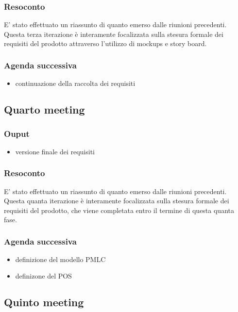 \subsubsection*{Resoconto}
E' stato effettuato un riassunto di quanto emerso dalle riunioni precedenti.
Questa terza iterazione è interamente focalizzata sulla stesura formale dei requisiti del prodotto attraverso 
l'utilizzo di mockups e story board.
\subsubsection*{Agenda successiva}
\begin{itemize}
    \item continuazione della raccolta dei requisiti
\end{itemize} 



\subsection*{Quarto meeting}
\subsubsection*{Ouput}
\begin{itemize}
    \item versione finale dei requisiti
\end{itemize} 
\subsubsection*{Resoconto}
E' stato effettuato un riassunto di quanto emerso dalle riunioni precedenti.
Questa quanta iterazione è interamente focalizzata sulla stesura formale dei requisiti del prodotto, 
che viene completata entro il termine di questa quanta fase.  
\subsubsection*{Agenda successiva}
\begin{itemize}
    \item definizione del modello PMLC
    \item definizone del POS
\end{itemize} 



\subsection*{Quinto meeting}
